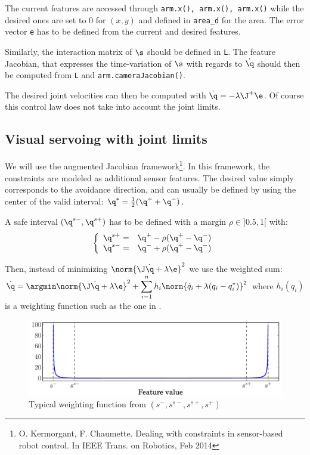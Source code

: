 \documentclass{ecnreport}
\begin{document}
The current features are accessed through \texttt{arm.x(), arm.x(), arm.x()} while the desired ones are set to 0 for $(x,y)$ and defined in \texttt{area\_d} for the area. 
The error vector \texttt{e} has to be defined from the current and desired features.

Similarly, the interaction matrix of $\s$ should be defined in \texttt{L}. The feature Jacobian, that expresses the time-variation of $\s$ with regards to $\dot \q$ should then be computed
from \texttt{L} and \texttt{arm.cameraJacobian()}.

The desired joint velocities can then be computed with $\dot \q = -\lambda\J^+\e$. Of course this control law does not take into account the joint limits.

\subsection{Visual servoing with joint limits}

We will use the augmented Jacobian framework\footnote{O. Kermorgant, F. Chaumette. Dealing with constraints in sensor-based robot control. In IEEE Trans. on Robotics, Feb 2014}.
In this framework, the constraints are modeled as additional sensor features. The desired value simply corresponds to the avoidance direction, and can usually be defined by using the center of the valid interval: $\q^* = \frac{1}{2}(\q^+ + \q^-)$.

A safe interval $(\q^{s-}, \q^{s+})$ has to be defined with a margin $\rho\in]0.5,1[$ with:
\begin{equation*}
\left\{\begin{array}{ll}
	\q^{s+} = & \q^{+} - \rho(\q^+ - \q^-) \\
	\q^{s-} = & \q^{-} + \rho(\q^+ - \q^-)
\end{array}\right.
\end{equation*}

Then, instead of minimizing $\norm{\J\dot \q + \lambda\e}^2$ we use the weighted sum:\\ $\displaystyle \dot \q = \argmin \norm{\J\dot \q + \lambda\e}^2 + \sum_{i=1}^n h_i\norm{\dot q_i + \lambda(q_i - q_i^*)}^2$ where $h_i(q_i)$ is a weighting function such as the one in .
\begin{figure}\centering
	\includegraphics[width=.7\linewidth]{constraint_0inf}
	\caption{Typical weighting function from $(s^-, s^{s-}, s^{s+}, s^+)$}
	\label{weight}		
\end{figure}
\end{document}
